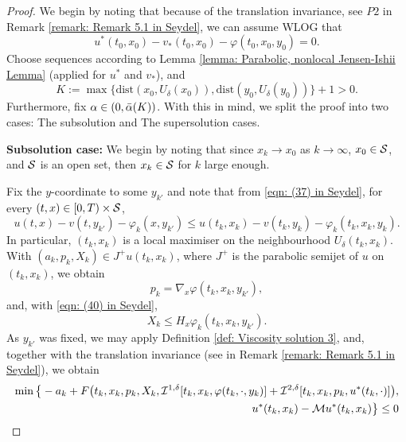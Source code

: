 \begin{proof}
    We begin by noting that because of the translation invariance, see  $P2$ in Remark \ref{remark: Remark 5.1 in Seydel}, we can assume WLOG that 
    \begin{equation*}
        u^*(t_0,x_0) - v_*(t_0,x_0) - \varphi(t_0,x_0,y_0) = 0.
    \end{equation*}
    Choose sequences according to Lemma \ref{lemma: Parabolic, nonlocal Jensen-Ishii Lemma} (applied for $u^*$ and $v_*$), and 
    \begin{equation*}
        K:= \max \big\{\text{dist}(x_0, U_\delta (x_0)), \text{dist}(y_0, U_\delta (y_0))\big\} + 1 > 0.
    \end{equation*}
    Furthermore, fix $\alpha \in (0,\Bar{\alpha}(K))$. With this in mind, we split the proof into two cases: The subsolution and The supersolution cases. 

    \textbf{Subsolution case:} We begin by noting that since $x_k \rightarrow x_0$ as $k \rightarrow \infty$, $x_0 \in \mathcal{S}$, and $\mathcal{S}$ is an open set, then $x_k \in \mathcal{S}$ for $k$ large enough. 
    
    Fix the $y$-coordinate to some $y_{k'}$ and note that from \eqref{eqn: (37) in Seydel}, for every $(t,x) \in [0,T) \times \mathcal{S}$, 
    \begin{equation*}
        u(t,x) - v(t,y_{k'}) - \varphi_k(x,y_{k'}) \leq u(t_k,x_k) - v(t_k,y_k) - \varphi_k(t_k,x_k,y_k). 
    \end{equation*}
    In particular, $(t_k,x_k)$ is a local maximiser on the neighbourhood $U_\delta(t_k,x_k)$. With $(a_k,p_k,X_k) \in J^+ u(t_k,x_k)$, where $J^+$ is the parabolic semijet of $u$ on $(t_k,x_k)$, we obtain
    \begin{equation*}
        p_k = \nabla_x \varphi (t_k,x_k,y_{k'}),
    \end{equation*}
    and, with \eqref{eqn: (40) in Seydel},
    \begin{equation*}
        X_k \leq H_x \varphi_k(t_k,x_k,y_{k'}). 
    \end{equation*}
    As $y_{k'}$ was fixed, we may apply Definition \ref{def: Viscosity solution 3}, and, together with the translation invariance (see  in Remark \ref{remark: Remark 5.1 in Seydel}), we obtain
    \begin{equation}
        \begin{aligned}
            \min \big\{ - a_k + F\big(t_k,x_k,p_k,X_k,\mathcal{I}^{1,\delta}[t_k,x_k,\varphi(t_k,\cdot,y_k)] + \mathcal{I}^{2,\delta}[t_k,x_k,p_k,u^*(t_k,\cdot)]\big), \nonumber \\
            u^*(t_k,x_k) - \mathcal{M} u^*(t_k,x_k)\big\} \leq 0
            \label{eqn: (42) in Seydel}
        \end{aligned}
    \end{equation}


\end{proof}

